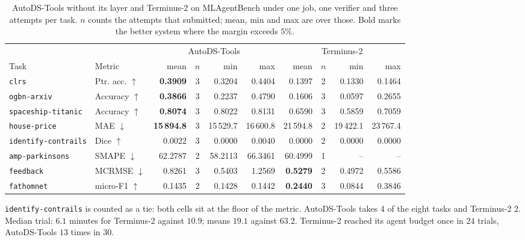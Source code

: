 \begin{table}[t]
\centering
\caption{AutoDS-Tools without its layer and Terminus-2 on MLAgentBench under one job, one verifier and three attempts per task. $n$ counts the attempts that submitted; mean, min and max are over those. Bold marks the better system where the margin exceeds $5\%$.}
\label{tab:mlabhead}
\small
\setlength{\tabcolsep}{5pt}
\begin{tabular}{llrcrrrcrr}
\toprule
 & & \multicolumn{4}{c}{AutoDS-Tools} & \multicolumn{4}{c}{Terminus-2} \\
\cmidrule(lr){3-6}\cmidrule(lr){7-10}
Task & Metric & mean & $n$ & min & max & mean & $n$ & min & max \\
\midrule
\texttt{clrs} & Ptr. acc. $\uparrow$ & \textbf{0.3909} & 3 & 0.3204 & 0.4404 & 0.1397 & 2 & 0.1330 & 0.1464 \\
\texttt{ogbn-arxiv} & Accuracy $\uparrow$ & \textbf{0.3866} & 3 & 0.2237 & 0.4790 & 0.1606 & 3 & 0.0597 & 0.2655 \\
\texttt{spaceship-titanic} & Accuracy $\uparrow$ & \textbf{0.8074} & 3 & 0.8022 & 0.8131 & 0.6590 & 3 & 0.5859 & 0.7059 \\
\texttt{house-price} & MAE $\downarrow$ & \textbf{15\,894.8} & 3 & 15\,529.7 & 16\,600.8 & 21\,594.8 & 2 & 19\,422.1 & 23\,767.4 \\
\texttt{identify-contrails} & Dice $\uparrow$ & 0.0022 & 3 & 0.0000 & 0.0040 & 0.0000 & 2 & 0.0000 & 0.0000 \\
\texttt{amp-parkinsons} & SMAPE $\downarrow$ & 62.2787 & 2 & 58.2113 & 66.3461 & 60.4999 & 1 & -- & -- \\
\texttt{feedback} & MCRMSE $\downarrow$ & 0.8261 & 3 & 0.5403 & 1.2569 & \textbf{0.5279} & 2 & 0.4972 & 0.5586 \\
\texttt{fathomnet} & micro-F1 $\uparrow$ & 0.1435 & 2 & 0.1428 & 0.1442 & \textbf{0.2440} & 3 & 0.0844 & 0.3846 \\
\bottomrule
\end{tabular}
\begin{tablenotes}\footnotesize
\item \texttt{identify-contrails} is counted as a tie: both cells sit at the floor of the metric. AutoDS-Tools takes 4 of the eight tasks and Terminus-2 2. Median trial: $6.1$ minutes for Terminus-2 against $10.9$; means $19.1$ against $63.2$. Terminus-2 reached its agent budget once in $24$ trials, AutoDS-Tools $13$ times in $30$.
\end{tablenotes}
\end{table}
